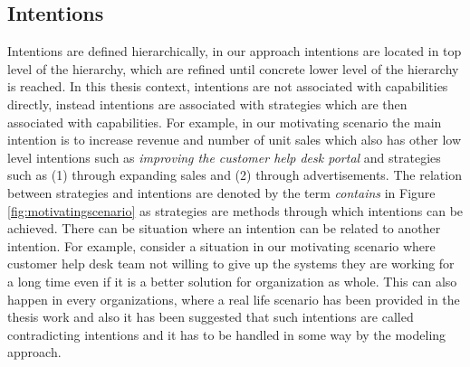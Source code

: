 \subsection{Intentions} 
\label{sec:intentions}
Intentions are defined hierarchically, in our approach intentions are located in top level of the hierarchy, which are refined until concrete lower level of the hierarchy is reached. In this thesis context, intentions are not associated with capabilities directly, instead intentions are associated with strategies which are then associated with capabilities. For example, in our motivating scenario the main intention is to increase revenue and number of unit sales which also has other low level intentions such as \textit{improving the customer help desk portal} and strategies such as (1) through expanding sales and (2) through advertisements. The relation between strategies and intentions are denoted by the term \textit{contains} in Figure \ref{fig:motivatingscenario} as strategies are methods through which intentions can be achieved. There can be situation where an intention can be related to another intention. For example, consider a situation in our motivating scenario where customer help desk team not willing to give up the systems they are working for a long time even if it is a better solution for organization as whole. This can also happen in every organizations, where a real life scenario has been provided in the thesis work \cite{Sierr2015} and also it has been suggested that such intentions are called contradicting intentions and it has to be handled in some way by the modeling approach. 

